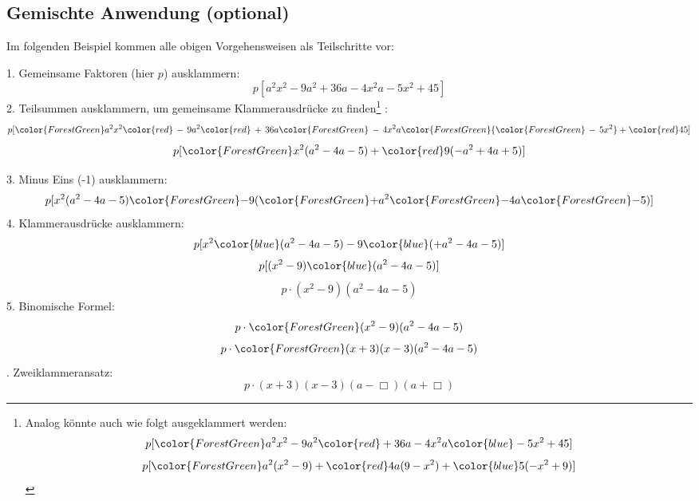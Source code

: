 




\newpage


\subsection{Gemischte Anwendung (optional)}
Im folgenden Beispiel kommen alle obigen Vorgehensweisen als
Teilschritte vor:

\begin{center}{}\end{center}


1. Gemeinsame Faktoren (hier $p$) ausklammern:
$$p[a^2x^2 - 9a^2 + 36a -4x^2a -5x^2 + 45]$$
2. Teilsummen ausklammern, um gemeinsame Klammerausdrücke zu finden\footnote{
Analog könnte auch wie folgt ausgeklammert werden:
$$p[{\color{ForestGreen}a^2x^2 -9a^2} {\color{red}+ 36a -4x^2a} {\color{blue}- 5x^2 + 45}]$$
$$p[{\color{ForestGreen}a^2}(x^2 - 9) + {\color{red}4a}(9 - x^2) + {\color{blue}5}(-x^2 + 9)]$$
}
:
$$p[{\color{ForestGreen}a^2x^2 } {\color{red}\, -\, 9a^2} {\color{red}\, +\, 36a} {\color{ForestGreen}\, -\, 4x^2a} {\color{ForestGreen} {\color{ForestGreen}\,-\,5x^2} } + {\color{red}45}]$$
$$p[{\color{ForestGreen}x^2} (a^2 -4a -5) + {\color{red}9}(-a^2 + 4a +5)]$$

3. Minus Eins (-1) ausklammern:
$$p[x^2 (a^2 -4a -5) {\color{ForestGreen}-} 9({\color{ForestGreen}+}a^2 {\color{ForestGreen}-} 4a {\color{ForestGreen}-} 5)]$$
4. Klammerausdrücke ausklammern:
$$p[x^2 {\color{blue}(a^2 -4a -5)} - 9{\color{blue}(+a^2 - 4a - 5)}]$$
$$p[(x^2-9) {\color{blue}(a^2 -4a -5)}]$$
$$p\cdot{}(x^2-9) (a^2 -4a -5)$$
5. Binomische Formel:
$$p\cdot{}{\color{ForestGreen}(x^2-9)}(a^2 -4a -5)$$
$$p\cdot{}{\color{ForestGreen}(x+3)(x-3)}(a^2 -4a -5)$$
. Zweiklammeransatz:
$$p\cdot{}(x+3)(x-3) (a-\Box{})(a+\Box{})$$

